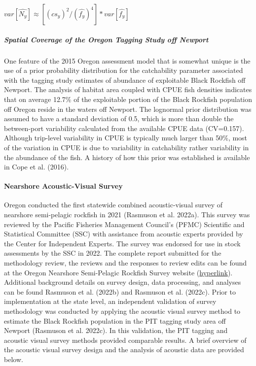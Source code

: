\documentclass[11pt,
  english,
  letterpaper,
]{article}
\begin{document}
\(var[\hat{N_y}] \approx [(cs_y)^2/(\hat{f_y})^4]*var[\hat{f_y}]\)

\hypertarget{spatial-coverage-of-the-oregon-tagging-study-off-newport}{%
\subparagraph{Spatial Coverage of the Oregon Tagging Study off Newport}\label{spatial-coverage-of-the-oregon-tagging-study-off-newport}}

One feature of the 2015 Oregon assessment model that is somewhat unique is the use of a prior probability distribution for the catchability parameter associated with the tagging study estimates of abundance of exploitable Black Rockfish off Newport. The analysis of habitat area coupled with CPUE fish densities indicates that on average 12.7\% of the exploitable portion of the Black Rockfish population off Oregon reside in the waters off Newport. The lognormal prior distribution was assumed to have a standard deviation of 0.5, which is more than double the between-port variability calculated from the available CPUE data (CV=0.157). Although trip-level variability in CPUE is typically much larger than 50\%, most of the variation in CPUE is due to variability in catchability rather variability in the abundance of the fish. A history of how this prior was established is available in Cope et al. (2016).

\hypertarget{nearshore-acoustic-visual-survey}{%
\paragraph{Nearshore Acoustic-Visual Survey}\label{nearshore-acoustic-visual-survey}}

Oregon conducted the first statewide combined acoustic-visual survey of nearshore semi-pelagic rockfish in 2021 (Rasmuson et al. 2022a). This survey was reviewed by the Pacific Fisheries Management Council's (PFMC) Scientific and Statistical Committee (SSC) with assistance from acoustic experts provided by the Center for Independent Experts. The survey was endorsed for use in stock assessments by the SSC in 2022. The complete report submitted for the methodology review, the reviews and the responses to review edits can be found at the Oregon Nearshore Semi-Pelagic Rockfish Survey website (\href{https://nrimp.dfw.state.or.us/DataClearinghouse/default.aspx?p=202\&XMLname=42630.xml}{hyperlink}). Additional background details on survey design, data processing, and analyses can be found Rasmuson et al. (2022b) and Rasmuson et al. (2022c). Prior to implementation at the state level, an independent validation of survey methodology was conducted by applying the acoustic visual survey method to estimate the Black Rockfish population in the PIT tagging study area off Newport (Rasmuson et al. 2022c). In this validation, the PIT tagging and acoustic visual survey methods provided comparable results. A brief overview of the acoustic visual survey design and the analysis of acoustic data are provided below.
\end{document}

